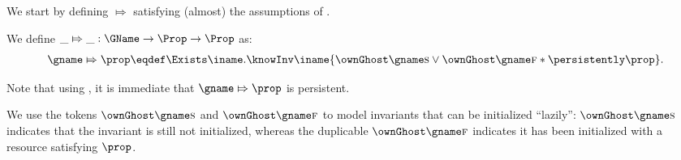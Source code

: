 
We start by defining $\Mapsto$ satisfying (almost) the assumptions of .
%
\begin{defn}
We define $\_ \Mapsto \_ : \GName \to \Prop \to \Prop$ as:
%
\begin{align*}
  \gname \Mapsto \prop \eqdef \Exists \iname. \knowInv \iname {\ownGhost \gname \starttoken \lor \ownGhost \gname \finishtoken * \persistently \prop}.
\end{align*}
\end{defn}
Note that using , it is immediate that $\gname \Mapsto \prop$ is persistent.

We use the tokens $\ownGhost \gname \starttoken$ and $\ownGhost \gname \finishtoken$ to model invariants that can be initialized ``lazily'': $\ownGhost \gname \starttoken$ indicates that the invariant is still not initialized, whereas the duplicable $\ownGhost \gname \finishtoken$ indicates it has been initialized with a resource satisfying $\prop$.%


